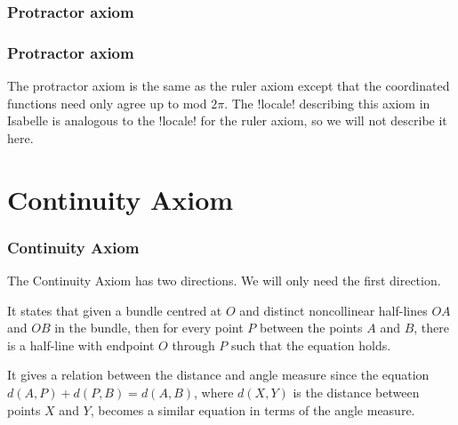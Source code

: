 \documentclass{beamer}
\begin{document}
{\graphicspath{{/Users/Imogen/Desktop/Birkhoff_Presentation/}}

\begin{frame}
\frametitle{Protractor axiom}
 
 
\end{frame}
}

\begin{frame}
\frametitle{Protractor axiom}
 The protractor axiom is the same as the ruler axiom except that the coordinated functions need only agree up to mod $2\pi$. The \Icode!locale! describing this axiom in Isabelle is analogous to the \Icode!locale! for the ruler axiom, so we will not describe it here.
 
\end{frame}

\section{Continuity Axiom}


\begin{frame}
\frametitle{Continuity Axiom}
The Continuity Axiom has two directions. We will only need the first direction.

It states that given a bundle centred at $O$ and distinct noncollinear half-lines $OA$ and $OB$ in the bundle, then for every point $P$ between the points $A$ and $B$, there is a half-line with endpoint $O$ through $P$ such that the equation holds. 

 It gives a relation between the distance and angle measure since the equation $d(A,P) + d(P,B) = d(A,B)$, where $d(X,Y)$ is the distance between points $X$ and $Y$, becomes a similar equation in terms of the angle measure.

\end{frame}
\end{document}
